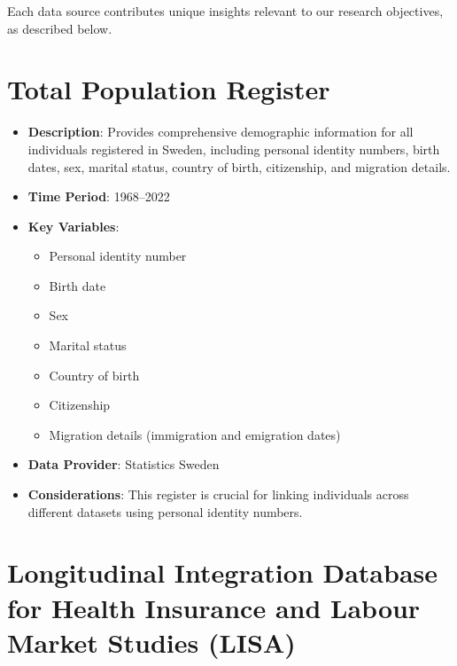 \documentclass[
]{book}
\providecommand{\tightlist}{%
  \setlength{\itemsep}{0pt}\setlength{\parskip}{0pt}}
\begin{document}
Each data source contributes unique insights relevant to our research objectives, as described below.

\hypertarget{total-population-register}{%
\section{Total Population Register}\label{total-population-register}}

\begin{itemize}
\tightlist
\item
  \textbf{Description}: Provides comprehensive demographic information for all individuals registered in Sweden, including personal identity numbers, birth dates, sex, marital status, country of birth, citizenship, and migration details.
\item
  \textbf{Time Period}: 1968--2022
\item
  \textbf{Key Variables}:

  \begin{itemize}
  \tightlist
  \item
    Personal identity number
  \item
    Birth date
  \item
    Sex
  \item
    Marital status
  \item
    Country of birth
  \item
    Citizenship
  \item
    Migration details (immigration and emigration dates)
  \end{itemize}
\item
  \textbf{Data Provider}: Statistics Sweden
\item
  \textbf{Considerations}: This register is crucial for linking individuals across different datasets using personal identity numbers.
\end{itemize}

\hypertarget{longitudinal-integration-database-for-health-insurance-and-labour-market-studies-lisa}{%
\section{Longitudinal Integration Database for Health Insurance and Labour Market Studies (LISA)}\label{longitudinal-integration-database-for-health-insurance-and-labour-market-studies-lisa}}
\end{document}
